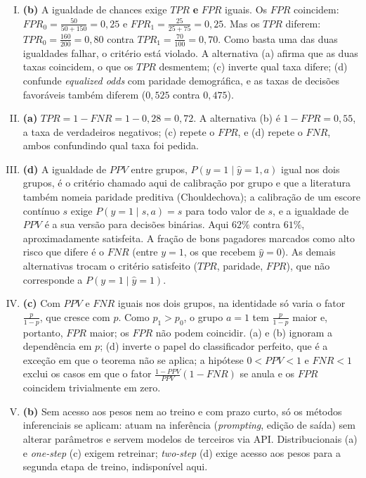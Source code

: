 \documentclass{dlproblemset}
\begin{document}
\begin{enumerate}[I)]
    \item \textbf{(b)} A igualdade de chances exige $TPR$ \textbf{e} $FPR$ iguais. Os $FPR$ coincidem: $FPR_0 = \frac{50}{50+150} = 0{,}25$ e $FPR_1 = \frac{25}{25+75} = 0{,}25$. Mas os $TPR$ diferem: $TPR_0 = \frac{160}{200} = 0{,}80$ contra $TPR_1 = \frac{70}{100} = 0{,}70$. Como basta uma das duas igualdades falhar, o critério está violado. A alternativa (a) afirma que as duas taxas coincidem, o que os $TPR$ desmentem; (c) inverte qual taxa difere; (d) confunde \textit{equalized odds} com paridade demográfica, e as taxas de decisões favoráveis também diferem ($0{,}525$ contra $0{,}475$).

    \item \textbf{(a)} $TPR = 1 - FNR = 1 - 0{,}28 = 0{,}72$. A alternativa (b) é $1 - FPR = 0{,}55$, a taxa de verdadeiros negativos; (c) repete o $FPR$, e (d) repete o $FNR$, ambos confundindo qual taxa foi pedida.

    \item \textbf{(d)} A igualdade de $PPV$ entre grupos, $P(y{=}1\mid \hat{y}{=}1, a)$ igual nos dois grupos, é o critério chamado aqui de calibração por grupo e que a literatura também nomeia paridade preditiva (Chouldechova); a calibração de um escore contínuo $s$ exige $P(y{=}1\mid s, a) = s$ para todo valor de $s$, e a igualdade de $PPV$ é a sua versão para decisões binárias. Aqui $62\%$ contra $61\%$, aproximadamente satisfeita. A fração de bons pagadores marcados como alto risco que difere é o $FNR$ (entre $y{=}1$, os que recebem $\hat{y}{=}0$). As demais alternativas trocam o critério satisfeito ($TPR$, paridade, $FPR$), que não corresponde a $P(y{=}1\mid\hat{y}{=}1)$.

    \item \textbf{(c)} Com $PPV$ e $FNR$ iguais nos dois grupos, na identidade só varia o fator $\frac{p}{1-p}$, que cresce com $p$. Como $p_1 > p_0$, o grupo $a{=}1$ tem $\frac{p}{1-p}$ maior e, portanto, $FPR$ maior; os $FPR$ não podem coincidir. (a) e (b) ignoram a dependência em $p$; (d) inverte o papel do classificador perfeito, que é a exceção em que o teorema não se aplica; a hipótese $0 < PPV < 1$ e $FNR < 1$ exclui os casos em que o fator $\frac{1-PPV}{PPV}(1-FNR)$ se anula e os $FPR$ coincidem trivialmente em zero.

    \item \textbf{(b)} Sem acesso aos pesos nem ao treino e com prazo curto, só os métodos inferenciais se aplicam: atuam na inferência (\textit{prompting}, edição de saída) sem alterar parâmetros e servem modelos de terceiros via API. Distribucionais (a) e \textit{one-step} (c) exigem retreinar; \textit{two-step} (d) exige acesso aos pesos para a segunda etapa de treino, indisponível aqui.


\end{enumerate}
\end{document}

